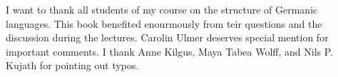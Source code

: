 \addchap{\lsAcknowledgementTitle} 



I want to thank all students of my course on the structure of Germanic languages. This book
benefited enourmously from teir questions and the discussion during the lectures. 
Carolin Ulmer %
deserves special mention for important comments. I thank 
Anne Kilgus,
Maya Tabea Wolff, and Nils P. Kujath 
for pointing out typos.

